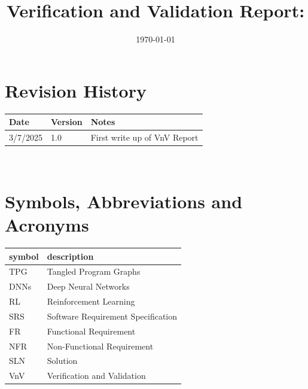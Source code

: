 \documentclass[12pt, titlepage]{article}
\begin{document}
\title{Verification and Validation Report: \progname} 
\author{\authname}
\date{\today}
	
\maketitle


\section{Revision History}

\begin{tabularx}{\textwidth}{p{3cm}p{2cm}X}
\toprule {\bf Date} & {\bf Version} & {\bf Notes}\\
\midrule
3/7/2025 & 1.0 & First write up of VnV Report \\
\bottomrule
\end{tabularx}

~\newpage

\section{Symbols, Abbreviations and Acronyms}

\renewcommand{\arraystretch}{1.2}
\begin{tabular}{l l} 
  \toprule		
  \textbf{symbol} & \textbf{description}\\
  \midrule 
  TPG & Tangled Program Graphs\\
  DNNs & Deep Neural Networks\\
  RL & Reinforcement Learning\\
  SRS & Software Requirement Specification\\
  FR & Functional Requirement\\
  NFR & Non-Functional Requirement\\
  SLN & Solution\\
  VnV & Verification and Validation\\
  \bottomrule
\end{tabular}\\


\newpage

\tableofcontents

\listoftables %

\listoffigures %
\end{document}

